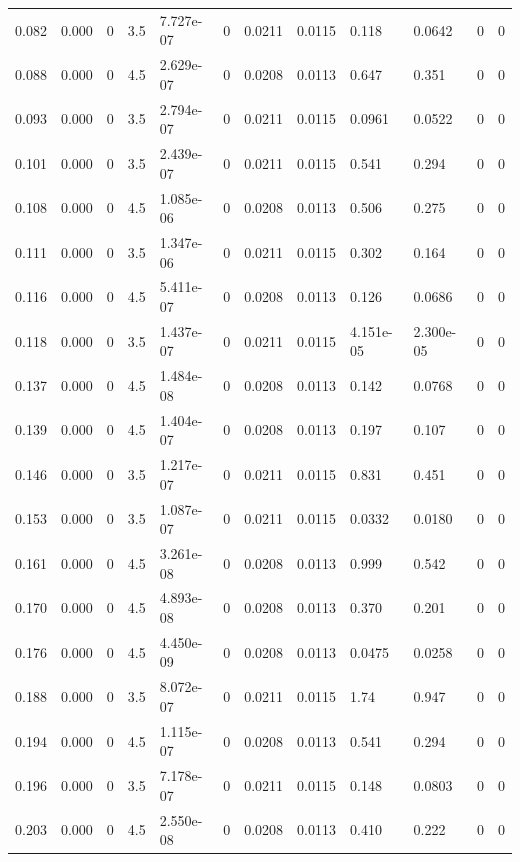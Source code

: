 \documentclass[preview]{standalone}
\begin{document}
{{\begin{tabular}{L{1.2cm}C{1.2cm} C{0.3cm}C{0.5cm} C{1.4cm}C{1.4cm} C{1.4cm}C{1.4cm} C{1.6cm}C{1.6cm} C{1.6cm}C{1.6cm}}
  0.082  &  0.000  & 0     & 3.5 &  7.727e-07  & 0  &  0.0211&   0.0115& 0.118 & 0.0642   &  0 & 0  \\ 
  0.088  &  0.000  & 0     & 4.5 &  2.629e-07  & 0  &  0.0208&   0.0113& 0.647 & 0.351   &  0 & 0  \\ 
  0.093  &  0.000  & 0     & 3.5 &  2.794e-07  & 0  &  0.0211&   0.0115& 0.0961 & 0.0522   &  0 & 0  \\ 
  0.101  &  0.000  & 0     & 3.5 &  2.439e-07  & 0  &  0.0211&   0.0115& 0.541 & 0.294   &  0 & 0  \\ 
  0.108  &  0.000  & 0     & 4.5 &  1.085e-06  & 0  &  0.0208&   0.0113& 0.506 & 0.275   &  0 & 0  \\ 
  0.111  &  0.000  & 0     & 3.5 &  1.347e-06  & 0  &  0.0211&   0.0115& 0.302 & 0.164   &  0 & 0  \\ 
  0.116  &  0.000  & 0     & 4.5 &  5.411e-07  & 0  &  0.0208&   0.0113& 0.126 & 0.0686   &  0 & 0  \\ 
  0.118  &  0.000  & 0     & 3.5 &  1.437e-07  & 0  &  0.0211&   0.0115& 4.151e-05 & 2.300e-05   &  0 & 0  \\ 
  0.137  &  0.000  & 0     & 4.5 &  1.484e-08  & 0  &  0.0208&   0.0113& 0.142 & 0.0768   &  0 & 0  \\ 
  0.139  &  0.000  & 0     & 4.5 &  1.404e-07  & 0  &  0.0208&   0.0113& 0.197 & 0.107   &  0 & 0  \\ 
  0.146  &  0.000  & 0     & 3.5 &  1.217e-07  & 0  &  0.0211&   0.0115& 0.831 & 0.451   &  0 & 0  \\ 
  0.153  &  0.000  & 0     & 3.5 &  1.087e-07  & 0  &  0.0211&   0.0115& 0.0332 & 0.0180   &  0 & 0  \\ 
  0.161  &  0.000  & 0     & 4.5 &  3.261e-08  & 0  &  0.0208&   0.0113& 0.999 & 0.542   &  0 & 0  \\ 
  0.170  &  0.000  & 0     & 4.5 &  4.893e-08  & 0  &  0.0208&   0.0113& 0.370 & 0.201   &  0 & 0  \\ 
  0.176  &  0.000  & 0     & 4.5 &  4.450e-09  & 0  &  0.0208&   0.0113& 0.0475 & 0.0258   &  0 & 0  \\ 
  0.188  &  0.000  & 0     & 3.5 &  8.072e-07  & 0  &  0.0211&   0.0115& 1.74 & 0.947   &  0 & 0  \\ 
  0.194  &  0.000  & 0     & 4.5 &  1.115e-07  & 0  &  0.0208&   0.0113& 0.541 & 0.294   &  0 & 0  \\ 
  0.196  &  0.000  & 0     & 3.5 &  7.178e-07  & 0  &  0.0211&   0.0115& 0.148 & 0.0803   &  0 & 0  \\ 
  0.203  &  0.000  & 0     & 4.5 &  2.550e-08  & 0  &  0.0208&   0.0113& 0.410 & 0.222   &  0 & 0  \\ 

\end{tabular}}}
\end{document}
